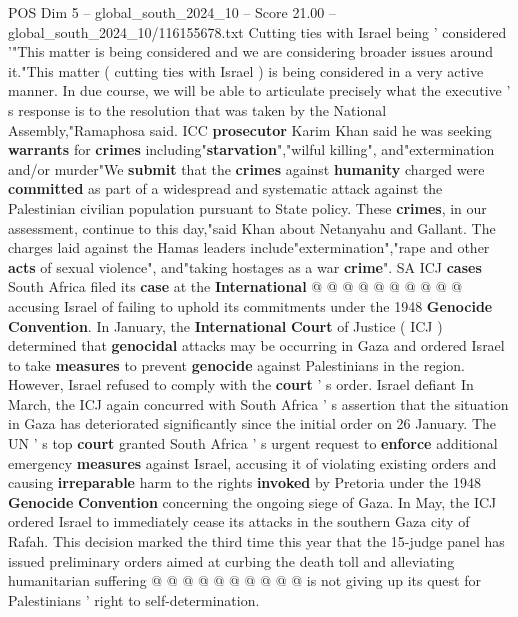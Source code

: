 \begin{textsample}{POS Dim 5 – global\_south\_2024\_10 – Score 21.00 – global\_south\_2024\_10/116155678.txt}  \label{ex:f5_pos_342}
Cutting ties with Israel being ' considered '"This matter is being considered and we are considering broader issues around it."This matter ( cutting ties with Israel ) is being considered in a very active manner.
In due course, we will be able to articulate precisely what the executive ' s response is to the resolution that was taken by the National Assembly,"Ramaphosa said.
ICC \textbf{prosecutor} Karim Khan said he was seeking \textbf{warrants} for \textbf{crimes} including"\textbf{starvation}","wilful killing", and"extermination and/or murder"We \textbf{submit} that the \textbf{crimes} against \textbf{humanity} charged were \textbf{committed} as part of a widespread and systematic attack against the Palestinian civilian population pursuant to State policy.
These \textbf{crimes}, in our assessment, continue to this day,"said Khan about Netanyahu and Gallant.
The charges laid against the Hamas leaders include"extermination","rape and other \textbf{acts} of sexual violence", and"taking hostages as a war \textbf{crime}".
SA ICJ \textbf{cases} South Africa filed its \textbf{case} at the \textbf{International} @ @ @ @ @ @ @ @ @ @ accusing Israel of failing to uphold its commitments under the 1948 \textbf{Genocide} \textbf{Convention}.
In January, the \textbf{International} \textbf{Court} of Justice ( ICJ ) determined that \textbf{genocidal} attacks may be occurring in Gaza and ordered Israel to take \textbf{measures} to prevent \textbf{genocide} against Palestinians in the region.
However, Israel refused to comply with the \textbf{court} ' s order.
Israel defiant In March, the ICJ again concurred with South Africa ' s assertion that the situation in Gaza has deteriorated significantly since the initial order on 26 January.
The UN ' s top \textbf{court} granted South Africa ' s urgent request to \textbf{enforce} additional emergency \textbf{measures} against Israel, accusing it of violating existing orders and causing \textbf{irreparable} harm to the rights \textbf{invoked} by Pretoria under the 1948 \textbf{Genocide} \textbf{Convention} concerning the ongoing siege of Gaza.
In May, the ICJ ordered Israel to immediately cease its attacks in the southern Gaza city of Rafah.
This decision marked the third time this year that the 15-judge panel has issued preliminary orders aimed at curbing the death toll and alleviating humanitarian suffering @ @ @ @ @ @ @ @ @ @ is not giving up its quest for Palestinians ' right to self-determination.

\end{textsample}
